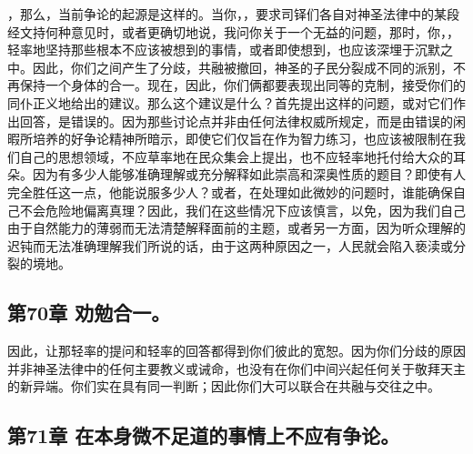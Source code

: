 ，那么，当前争论的起源是这样的。当你，，要求司铎们各自对神圣法律中的某段经文持何种意见时，或者更确切地说，我问你关于一个无益的问题，那时，你，，轻率地坚持那些根本不应该被想到的事情，或者即使想到，也应该深埋于沉默之中。因此，你们之间产生了分歧，共融被撤回，神圣的子民分裂成不同的派别，不再保持一个身体的合一。现在，因此，你们俩都要表现出同等的克制，接受你们的同仆正义地给出的建议。那么这个建议是什么？首先提出这样的问题，或对它们作出回答，是错误的。因为那些讨论点并非由任何法律权威所规定，而是由错误的闲暇所培养的好争论精神所暗示，即使它们仅旨在作为智力练习，也应该被限制在我们自己的思想领域，不应草率地在民众集会上提出，也不应轻率地托付给大众的耳朵。因为有多少人能够准确理解或充分解释如此崇高和深奥性质的题目？即使有人完全胜任这一点，他能说服多少人？或者，在处理如此微妙的问题时，谁能确保自己不会危险地偏离真理？因此，我们在这些情况下应该慎言，以免，因为我们自己由于自然能力的薄弱而无法清楚解释面前的主题，或者另一方面，因为听众理解的迟钝而无法准确理解我们所说的话，由于这两种原因之一，人民就会陷入亵渎或分裂的境地。\par


\subsection{第70章 劝勉合一。}

因此，让那轻率的提问和轻率的回答都得到你们彼此的宽恕。因为你们分歧的原因并非神圣法律中的任何主要教义或诫命，也没有在你们中间兴起任何关于敬拜天主的新异端。你们实在具有同一判断；因此你们大可以联合在共融与交往之中。\par


\subsection{第71章 在本身微不足道的事情上不应有争论。}

